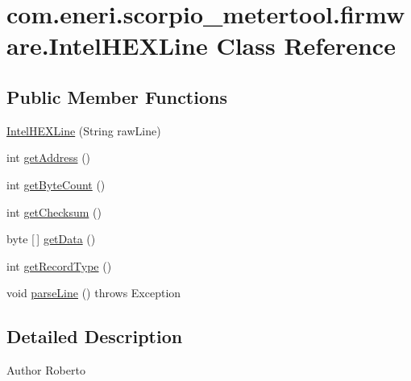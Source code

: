 \hypertarget{classcom_1_1eneri_1_1scorpio__metertool_1_1firmware_1_1_intel_h_e_x_line}{}\section{com.\+eneri.\+scorpio\+\_\+metertool.\+firmware.\+Intel\+H\+E\+X\+Line Class Reference}
\label{classcom_1_1eneri_1_1scorpio__metertool_1_1firmware_1_1_intel_h_e_x_line}
\subsection*{Public Member Functions}
\begin{DoxyCompactItemize}
\item 
\hyperlink{classcom_1_1eneri_1_1scorpio__metertool_1_1firmware_1_1_intel_h_e_x_line_aa1582ecc4af7d56628fc0b5563b68d14}{Intel\+H\+E\+X\+Line} (String raw\+Line)
\item 
int \hyperlink{classcom_1_1eneri_1_1scorpio__metertool_1_1firmware_1_1_intel_h_e_x_line_ab81719d54950b3a1c1c3648af61c9ea1}{get\+Address} ()
\item 
int \hyperlink{classcom_1_1eneri_1_1scorpio__metertool_1_1firmware_1_1_intel_h_e_x_line_a7828cce67103aaf5c2c80cd4ef3b08bc}{get\+Byte\+Count} ()
\item 
int \hyperlink{classcom_1_1eneri_1_1scorpio__metertool_1_1firmware_1_1_intel_h_e_x_line_a44c83b689c1558f6d2561bdc7a7688de}{get\+Checksum} ()
\item 
byte \mbox{[}$\,$\mbox{]} \hyperlink{classcom_1_1eneri_1_1scorpio__metertool_1_1firmware_1_1_intel_h_e_x_line_af178881cf835cad3f3bae5270714d975}{get\+Data} ()
\item 
int \hyperlink{classcom_1_1eneri_1_1scorpio__metertool_1_1firmware_1_1_intel_h_e_x_line_a27425ed633805da389690228577468cc}{get\+Record\+Type} ()
\item 
void \hyperlink{classcom_1_1eneri_1_1scorpio__metertool_1_1firmware_1_1_intel_h_e_x_line_afca7295f7b5be672181d899a9cee410e}{parse\+Line} ()  throws Exception   
\end{DoxyCompactItemize}


\subsection{Detailed Description}
\begin{DoxyAuthor}{Author}
Roberto 
\end{DoxyAuthor}


